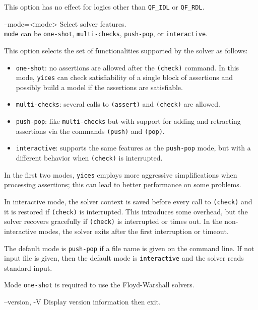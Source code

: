 \documentclass[11pt,twoside,fleqn,openright,titlepage]{cslreport}
\newenvironment{options}{
\begin{list}{}{
\setlength{\labelsep}{1.8ex}
\setlength{\labelwidth}{0pt}
\setlength{\itemindent}{-0.5\leftmargin}
\settowidth{\leftmargin}{\texttt{--}}
\renewcommand{\makelabel}{\optionlabel}}}
{\end{list}}
\newcommand*\optionlabel[1]{\hspace\labelsep\texttt{#1}}
\begin{document}
\begin{options}
  This option has no effect  for logics other than \texttt{QF\_IDL} or
  \texttt{QF\_RDL}.

\item[--mode=<mode>] Select solver features.\\[1mm]
  \texttt{mode} can be \texttt{one-shot}, \texttt{multi-checks},
  \texttt{push-pop}, or \texttt{interactive}.

  This  option selects  the set  of functionalities  supported  by the
  solver as follows:
  \begin{itemize}
  \item   \texttt{one-shot}:   no   assertions   are   allowed   after
    the \texttt{(check)} command. In this mode, \texttt{yices} can
    check satisfiability of a single block of assertions and possibly
    build a model if the assertions are satisfiable.
  \item \texttt{multi-checks}: several  calls to \texttt{(assert)} and
    \texttt{(check)} are allowed.
  \item \texttt{push-pop}: like \texttt{multi-checks} but with support
    for   adding   and   retracting   assertions  via   the   commands
    \texttt{(push)} and \texttt{(pop)}.
  \item  \texttt{interactive}:  supports  the  same  features  as  the
    \texttt{push-pop}  mode,  but  with   a  different  behavior  when
    \texttt{(check)} is interrupted.
  \end{itemize}
  In  the  first  two  modes, \texttt{yices}  employs  more  aggressive
  simplifications when processing assertions;  this can lead to better
  performance on some problems.

  In interactive mode,  the solver context is saved  before every call
  to  \texttt{(check)}  and  it  is restored  if  \texttt{(check)}  is
  interrupted. This introduces some  overhead, but the solver recovers
  gracefully if  \texttt{(check)} is interrupted or times  out. In the
  non-interactive modes, the solver exits after the first interruption
  or timeout.

  The default mode is \texttt{push-pop} if a file name is given on the
  command line. If  not input file is given, then  the default mode is
  \texttt{interactive} and the solver reads standard input.

  Mode \texttt{one-shot} is required to use the Floyd-Warshall solvers.

\item[--version, -V] Display version information then exit.


\end{options}
\end{document}
